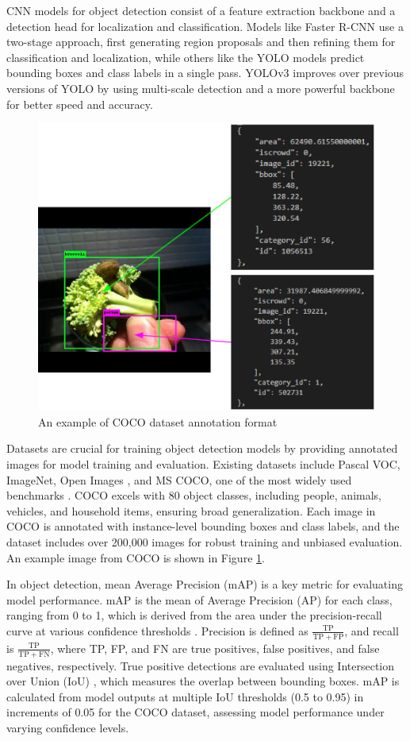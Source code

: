 \documentclass[10pt]{cai}
\begin{document}
CNN models for object detection consist of a feature extraction backbone and a detection head for localization and classification. Models like Faster R-CNN \cite{ren2016fasterrcnnrealtimeobject} use a two-stage approach, first generating region proposals and then refining them for classification and localization, while others like the YOLO models \cite{redmon2018yolov3incrementalimprovement} predict bounding boxes and class labels in a single pass. YOLOv3 improves over previous versions of YOLO by using multi-scale detection and a more powerful backbone for better speed and accuracy.


\begin{figure}
    \centering
    \captionsetup{justification=centering}
    \includegraphics[width=0.5\linewidth]{figs/label.PNG}
    \caption{An example of COCO dataset annotation format}
    \label{fig:coco}
\end{figure}

Datasets are crucial for training object detection models by providing annotated images for model training and evaluation. Existing datasets include Pascal VOC, ImageNet, Open Images \cite{zaidi2021survey}, and MS COCO, one of the most widely used benchmarks \cite{lin2015microsoft}. COCO excels with 80 object classes, including people, animals, vehicles, and household items, ensuring broad generalization. Each image in COCO is annotated with instance-level bounding boxes and class labels, and the dataset includes over 200,000 images for robust training and unbiased evaluation. An example image from COCO is shown in Figure \ref{fig:coco}.

In object detection, mean Average Precision (mAP) is a key metric for evaluating model performance. mAP is the mean of Average Precision (AP) for each class, ranging from 0 to 1, which is derived from the area under the precision-recall curve at various confidence thresholds \cite{map}. Precision is defined as $\frac{\mathrm{TP}}{\mathrm{TP} + \mathrm{FP}}$, and recall is $\frac{\mathrm{TP}}{\mathrm{TP} + \mathrm{FN}}$, where TP, FP, and FN are true positives, false positives, and false negatives, respectively. True positive detections are evaluated using Intersection over Union (IoU) \cite{iou}, which measures the overlap between bounding boxes. mAP is calculated from model outputs at multiple IoU thresholds (0.5 to 0.95) in increments of 0.05 for the COCO dataset, assessing model performance under varying confidence levels. 
\end{document}
